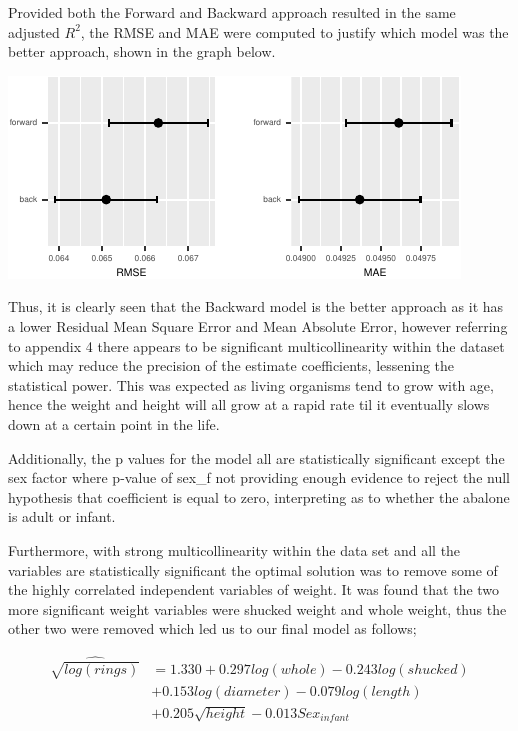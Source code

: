 \documentclass[letterpaper,9pt,twocolumn,twoside,]{pinp}
\begin{document}
Provided both the Forward and Backward approach resulted in the same
adjusted \(R^2\), the RMSE and MAE were computed to justify which model
was the better approach, shown in the graph below.

\begin{center}\includegraphics{ExecSum_files/figure-latex/unnamed-chunk-8-1} \end{center}

Thus, it is clearly seen that the Backward model is the better approach
as it has a lower Residual Mean Square Error and Mean Absolute Error,
however referring to appendix 4 there appears to be significant
multicollinearity within the dataset which may reduce the precision of
the estimate coefficients, lessening the statistical power. This was
expected as living organisms tend to grow with age, hence the weight and
height will all grow at a rapid rate til it eventually slows down at a
certain point in the life.

\par

Additionally, the p values for the model all are statistically
significant except the sex factor where p-value of sex\_f not providing
enough evidence to reject the null hypothesis that coefficient is equal
to zero, interpreting as to whether the abalone is adult or infant.

\par

Furthermore, with strong multicollinearity within the data set and all
the variables are statistically significant the optimal solution was to
remove some of the highly correlated independent variables of weight. It
was found that the two more significant weight variables were shucked
weight and whole weight, thus the other two were removed which led us to
our final model as follows;

\begin{align*}
  \widehat{\sqrt{log(rings)}} &= 1.330 + 0.297 log(whole) -0.243 log(shucked)\\
  & + 0.153 log(diameter) -0.079 log(length)\\
  & + 0.205\sqrt{height}-0.013 Sex_{infant}
\end{align*}
\end{document}
